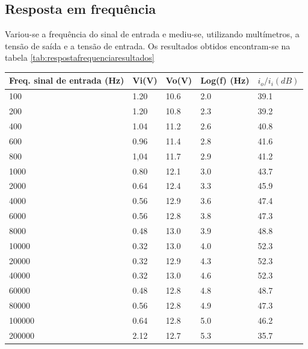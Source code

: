 \documentclass[%
  reprint,
  nofootinbib,
  amsmath,amssymb,
  aps,
  10pt,
  a4paper
]{revtex4-1}
\begin{document}
\subsection{Resposta em frequência}
Variou-se a frequência do sinal de entrada e mediu-se, utilizando multímetros, a tensão de saída e a tensão de entrada. Os resultados obtidos encontram-se na tabela \ref{tab:respostafrequenciaresultados}
\begin{table}[h]
    \begin{tabular}{|l|l|l|l|l|}
    \hline
    Freq. sinal de entrada (Hz) & Vi(V) & Vo(V)& Log(f) (Hz)& $i_o/i_i (dB)$ \\ \hline
    100                              & 1.20  & 10.6 & 2.0& 39.1                                  \\ \hline
    200                              & 1.20  & 10.8 & 2.3	&39.2			\\ \hline
    400                              & 1.04  & 11.2 & 2.6	&40.8			\\ \hline
    600                              & 0.96  & 11.4 & 2.8	&41.6			\\ \hline
    800                              & 1,04  & 11.7 & 2.9	&41.2			\\ \hline
    1000                             & 0.80  & 12.1&  3.0	&43.7			\\ \hline
    2000                             & 0.64  & 12.4&  3.3	&45.9			\\ \hline
    4000                             & 0.56  & 12.9&  3.6	&47.4			\\ \hline
    6000                             & 0.56  & 12.8&  3.8	&47.3			\\ \hline
    8000                             & 0.48  & 13.0&  3.9	&48.8			\\ \hline
    10000                            & 0.32  & 13.0&  4.0&52.3				\\ \hline
    20000                            & 0.32  & 12.9&  4.3&52.3				\\ \hline
    40000                            & 0.32  & 13.0&  4.6&52.3				\\ \hline
    60000                            & 0.48  & 12.8&  4.8&48.7				\\ \hline
    80000                            & 0.56  & 12.8&  4.9&47.3				\\ \hline
    100000                           & 0.64  & 12.8&  5.0&46.2				\\ \hline
    200000                           & 2.12  & 12.7&  5.3&35.7			\\ \hline

\end{tabular}
\end{table}
\end{document}
